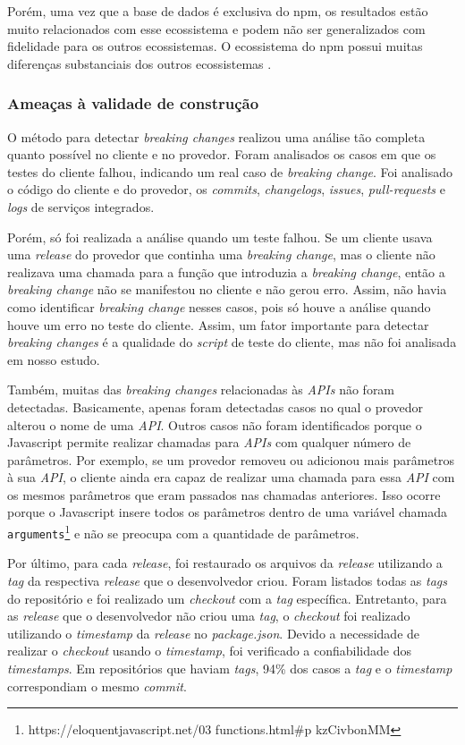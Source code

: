 Porém, uma vez que a base de dados é exclusiva do \textsf{npm}, os resultados estão muito relacionados com esse ecossistema e podem não ser generalizados com fidelidade para os outros ecossistemas. O ecossistema do \textsf{npm} possui muitas diferenças substanciais dos outros ecossistemas \cite{how_to_break_an_api}.

\subsubsection{Ameaças à validade de construção}
O método para detectar \textit{breaking changes} realizou uma análise tão completa quanto possível no cliente e no provedor. Foram analisados os casos em que os testes do cliente falhou, indicando um real caso de \textit{breaking change}. Foi analisado o código do cliente e do provedor, os \textit{commits}, \textit{changelogs}, \textit{issues}, \textit{pull-requests} e \textit{logs} de serviços integrados.

Porém, só foi realizada a análise quando um teste falhou. Se um cliente usava uma \textit{release} do provedor que continha uma \textit{breaking change}, mas o cliente não realizava uma chamada para a função que introduzia a \textit{breaking change}, então a \textit{breaking change} não se manifestou no cliente e não gerou erro. Assim, não havia como identificar \textit{breaking change} nesses casos, pois só houve a análise quando houve um erro no teste do cliente. Assim, um fator importante para detectar \textit{breaking changes} é a qualidade do \textit{script} de teste do cliente, mas não foi analisada em nosso estudo.

Também, muitas das \textit{breaking changes} relacionadas às \textit{APIs} não foram detectadas. Basicamente, apenas foram detectadas casos no qual o provedor alterou o nome de uma \textit{API}. Outros casos não foram identificados porque o \textsf{Javascript} permite realizar chamadas para \textit{APIs} com qualquer número de parâmetros. Por exemplo, se um provedor removeu ou adicionou mais parâmetros à sua \textit{API}, o cliente ainda era capaz de realizar uma chamada para essa \textit{API} com os mesmos parâmetros que eram passados nas chamadas anteriores. Isso ocorre porque o \textsf{Javascript} insere todos os parâmetros dentro de uma variável chamada \texttt{arguments}\footnote{https://eloquentjavascript.net/03 functions.html\#p kzCivbonMM} e não se preocupa com a quantidade de parâmetros.

Por último, para cada \textit{release}, foi restaurado os arquivos da \textit{release} utilizando a \textit{tag} da respectiva \textit{release} que o desenvolvedor criou. Foram listados todas as \textit{tags} do repositório e foi realizado um \textit{checkout} com a \textit{tag} específica. Entretanto, para as \textit{release} que o desenvolvedor não criou uma \textit{tag}, o \textit{checkout} foi realizado utilizando o \textit{timestamp} da \textit{release} no \textit{package.json}. Devido a necessidade de realizar o \textit{checkout} usando o \textit{timestamp}, foi verificado a confiabilidade dos \textit{timestamps}. Em repositórios que haviam \textit{tags}, 94\% dos casos a \textit{tag} e o \textit{timestamp} correspondiam o mesmo \textit{commit}.
